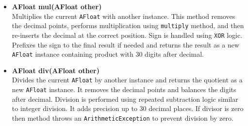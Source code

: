 \documentclass{article}
\begin{document}
\begin{itemize}
    \item \textbf{AFloat mul(AFloat other)} \\
    Multiplies the current \texttt{AFloat} with another instance. This method removes the decimal points, performs multiplication using \texttt{multiply} method, and then re-inserts the decimal at the correct position. Sign is handled using \texttt{XOR} logic. Prefixes the sign to the final result if needed and returns the result as a new \texttt{AFloat} instance containing product with 30 digits after decimal.

    \item \textbf{AFloat div(AFloat other)} \\
    Divides the current \texttt{AFloat} by another instance and returns the quotient as a new \texttt{AFloat} instance. It removes the decimal points and balances the digits after decimal. Division is performed using repeated subtraction logic similar to integer division. It adds precision up to 30 decimal places. If divisor is zero then method throws an \texttt{ArithmeticException} to prevent division by zero.

\end{itemize}
    
\end{document}
